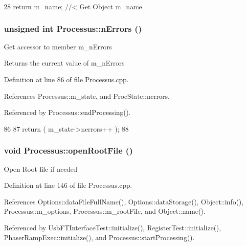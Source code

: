 \begin{DoxyCode}
28 { return m_name; } //< Get Object m_name
\end{DoxyCode}
\hypertarget{classProcessus_a82a0487f82f07cc2c2dc2731f98149e7}{
\subsubsection[{nErrors}]{\setlength{\rightskip}{0pt plus 5cm}unsigned int Processus::nErrors ()}}
\label{classProcessus_a82a0487f82f07cc2c2dc2731f98149e7}
Get accessor to member m\_\-nErrors \begin{DoxyReturn}{Returns}
the current value of m\_\-nErrors 
\end{DoxyReturn}


Definition at line 86 of file Processus.cpp.

References Processus::m\_\-state, and ProcState::nerrors.

Referenced by Processus::endProcessing().


\begin{DoxyCode}
86                                 {
87   return ( m_state->nerrors++ );
88 }
\end{DoxyCode}
\hypertarget{classProcessus_aacf6812880c1d1a2bf14a4a39458f443}{
\subsubsection[{openRootFile}]{\setlength{\rightskip}{0pt plus 5cm}void Processus::openRootFile ()}}
\label{classProcessus_aacf6812880c1d1a2bf14a4a39458f443}
Open Root file if needed 

Definition at line 146 of file Processus.cpp.

References Options::dataFileFullName(), Options::dataStorage(), Object::info(), Processus::m\_\-options, Processus::m\_\-rootFile, and Object::name().

Referenced by UsbFTInterfaceTest::initialize(), RegisterTest::initialize(), PhaserRampExec::initialize(), and Processus::startProcessing().


